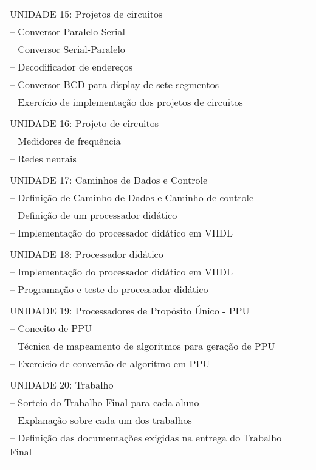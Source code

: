 \documentclass[12pt]{article}
\begin{document}
\begin{longtable}{|L{1.025\textwidth}|}
UNIDADE 15: Projetos de circuitos\\
– Conversor Paralelo-Serial\\
– Conversor Serial-Paralelo\\
– Decodificador de endereços\\
– Conversor BCD para display de sete segmentos\\
– Exercício de implementação dos projetos de circuitos\\
\\

UNIDADE 16: Projeto de circuitos\\
– Medidores de frequência\\
– Redes neurais\\
\\

UNIDADE 17: Caminhos de Dados e Controle\\
– Definição de Caminho de Dados e Caminho de controle\\
– Definição de um processador didático\\
– Implementação do processador didático em VHDL\\
\\

UNIDADE 18: Processador didático\\
– Implementação do processador didático em VHDL\\
– Programação e teste do processador didático\\
\\

UNIDADE 19: Processadores de Propósito Único - PPU\\
– Conceito de PPU\\
– Técnica de mapeamento de algoritmos para geração de PPU\\
– Exercício de conversão de algoritmo em PPU\\
\\

UNIDADE 20: Trabalho\\
– Sorteio do Trabalho Final para cada aluno\\
– Explanação sobre cada um dos trabalhos\\
– Definição das documentações exigidas na entrega do Trabalho Final\\
\\

\hline
\end{longtable} 

\newpage
\end{document}
